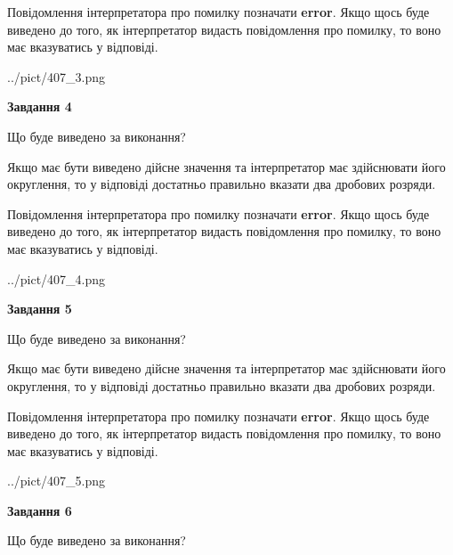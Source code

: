 \documentclass[12pt, ukrainian]{article}
\begin{document}
{\begin {Large}
Повідомлення інтерпретатора про помилку позначати \textbf{error}.
Якщо щось буде виведено до того, як інтерпретатор видасть повідомлення про помилку, 
то воно має вказуватись у відповіді. \par

\begin{center}
	{../pict/407_3.png}
\end{center}
\newpage

{\begin {center}\textbf{Завдання 4}\end {center}}\par
Що буде виведено за виконання? \par

Якщо має бути виведено дійсне значення та інтерпретатор має здійснювати його округлення, 
то у відповіді достатньо правильно вказати два дробових розряди.

Повідомлення інтерпретатора про помилку позначати \textbf{error}.
Якщо щось буде виведено до того, як інтерпретатор видасть повідомлення про помилку, 
то воно має вказуватись у відповіді. \par

\begin{center}
	{../pict/407_4.png}
\end{center}
\newpage

{\begin {center}\textbf{Завдання 5}\end {center}}\par
Що буде виведено за виконання? \par

Якщо має бути виведено дійсне значення та інтерпретатор має здійснювати його округлення, 
то у відповіді достатньо правильно вказати два дробових розряди.

Повідомлення інтерпретатора про помилку позначати \textbf{error}.
Якщо щось буде виведено до того, як інтерпретатор видасть повідомлення про помилку, 
то воно має вказуватись у відповіді. \par

\begin{center}
	{../pict/407_5.png}
\end{center}
\newpage

{\begin {center}\textbf{Завдання 6}\end {center}}\par
Що буде виведено за виконання? \par


\end{Large}}
\end{document}
